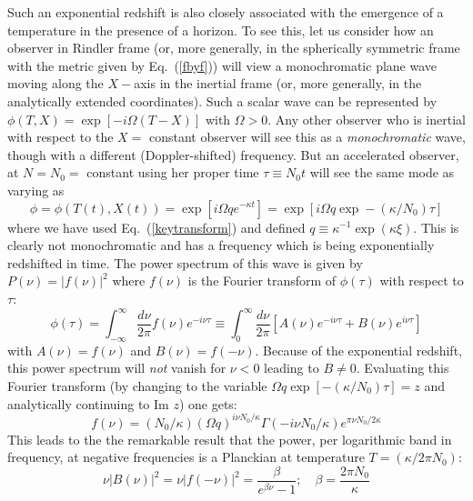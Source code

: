 \documentclass[12pt]{iopart}
\def\eq#1{{Eq.~(\ref{#1})}}
\begin{document}
Such an exponential redshift is also closely associated with the emergence of a temperature in the presence of a horizon. To see this, let us consider how an observer in Rindler frame (or, more generally, in the spherically symmetric frame with the metric given by \eq{fbyf})
will view a monochromatic plane wave moving along the $X-$axis in the inertial frame (or, more generally, in the analytically extended coordinates). Such a scalar wave can be represented by 
$\phi(T,X)=\exp[-i\Omega(T- X)]$ with $\Omega>0$. 
  Any other observer who is inertial with respect to the $X=$ constant observer will see this as a 
  {\it monochromatic} wave, though  with a different (Doppler-shifted) frequency. But an accelerated observer,
  at $N=N_0 =$ constant  
   using her proper
  time  $\tau \equiv N_0 t$ will see the same mode as varying  as 
  \begin{equation}
  \phi = \phi(T(t),X(t))=\exp[i\Omega q e^{- \kappa t}]
  = \exp[i\Omega q \exp - (\kappa/N_0)\tau]
\label{expodamp}
  \end{equation}
  where we have used Eq.~(\ref{keytransform}) and defined $q\equiv \kappa^{-1} \exp( \kappa\xi) $.
  This is clearly not monochromatic and has a frequency which is being exponentially redshifted in time. The power spectrum   of this wave 
  is given by $P(\nu) = |f(\nu)|^2$ where $f(\nu)$ is the Fourier transform of $\phi(\tau)$ with
  respect to $\tau$:
  \begin{equation}
  \phi(\tau) = \int_{-\infty}^\infty \frac{d\nu}{2\pi} f(\nu) e^{-i\nu \tau}
  \equiv \int_0^\infty \frac{d\nu}{2\pi} \left[ A(\nu) e^{-i\nu \tau} + B(\nu)e^{i\nu \tau}\right]
  \label{ftf}
  \end{equation}
  with $A(\nu)= f(\nu)$ and $B(\nu)=f(-\nu)$.
   Because of the exponential redshift, this power spectrum will \emph{not} vanish
  for $\nu<0$ leading to $B \neq 0$. Evaluating this Fourier transform (by changing to the variable 
  $\Omega q \exp[-( \kappa/N_0) \tau ] =z$
  and analytically continuing to Im $z$) one gets:
  \begin{equation}
 f(\nu) =(N_0/ \kappa) (\Omega q)^{i\nu N_0/\kappa } \Gamma(-i\nu N_0/ \kappa)
  e^{\pi \nu N_0/2 \kappa} 
 \label{powernu}
 \end{equation}
  This leads to the 
   the remarkable result
  that the power, per logarithmic band in frequency, at negative frequencies  
  is a Planckian at temperature $T= (\kappa/2\pi N_0)$: 
  \begin{equation}
\nu|B(\nu)|^2 = \nu\vert f (-\nu)\vert^2 =  \frac{\beta}{e^{\beta \nu} - 1 } ; \quad \beta = \frac{2\pi N_0}{\kappa }
  \label{planck}
  \end{equation}
\end{document}
